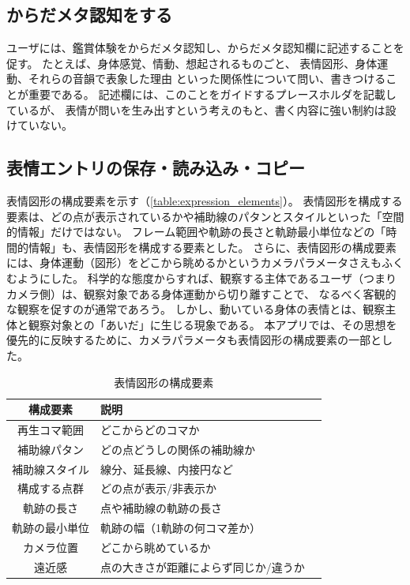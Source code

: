 \subsection{からだメタ認知をする}

ユーザには、鑑賞体験をからだメタ認知し、からだメタ認知欄に記述することを促す。
たとえば、身体感覚、情動、想起されるものごと、
表情図形、身体運動、それらの音韻で表象した理由
といった関係性について問い、書きつけることが重要である。
記述欄には、このことをガイドするプレースホルダを記載しているが、
表情が問いを生み出すという考えのもと、書く内容に強い制約は設けていない。

\subsection{表情エントリの保存・読み込み・コピー}
表情図形の構成要素を示す（\autoref{table:expression_elements}）。
表情図形を構成する要素は、どの点が表示されているかや補助線のパタンとスタイルといった「空間的情報」だけではない。
フレーム範囲や軌跡の長さと軌跡最小単位などの「時間的情報」も、表情図形を構成する要素とした。
さらに、表情図形の構成要素には、身体運動（図形）をどこから眺めるかというカメラパラメータさえもふくむようにした。
科学的な態度からすれば、観察する主体であるユーザ（つまりカメラ側）は、観察対象である身体運動から切り離すことで、
なるべく客観的な観察を促すのが通常であろう。
しかし、動いている身体の表情とは、観察主体と観察対象との「あいだ」\cite{kimura:2005}に生じる現象である。
本アプリでは、その思想を優先的に反映するために、カメラパラメータも表情図形の構成要素の一部とした。

\begin{table}[htbp]
  \begin{center}
  \caption{表情図形の構成要素}                %
  \label{table:expression_elements}
  \begin{tabular}[hbt]{c l l}
  \hline
  \bf 構成要素 & \bf 説明 \\
  \hline
  再生コマ範囲 & どこからどのコマか \\
  補助線パタン & どの点どうしの関係の補助線か　\\
  補助線スタイル & 線分、延長線、内接円など \\
  構成する点群 & どの点が表示/非表示か \\
  軌跡の長さ & 点や補助線の軌跡の長さ \\
  軌跡の最小単位 & 軌跡の幅（1軌跡の何コマ差か） \\
  カメラ位置 & どこから眺めているか & \\
  遠近感 & 点の大きさが距離によらず同じか/違うか \\  
  \hline
  \end{tabular}
  \end{center}
\end{table}

